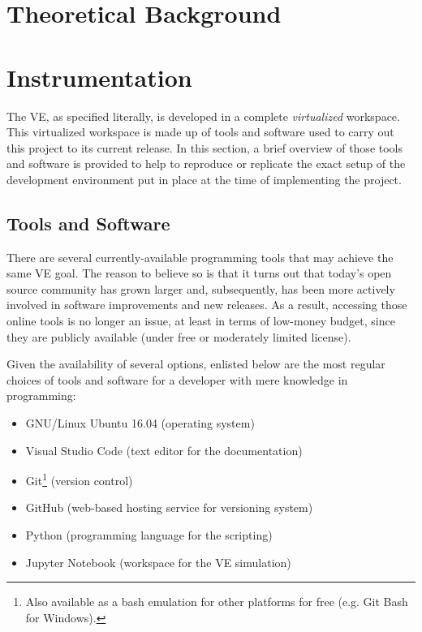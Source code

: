 %
%
%
%


\section{Theoretical Background}

\section{Instrumentation}

The VE, as specified literally, is developed in a complete \emph{virtualized} workspace. This virtualized workspace is made up of tools and software used to carry out this project to its current release. In this section, a brief overview of those tools and software is provided to help to reproduce or replicate the exact setup of the development environment put in place at the time of implementing the project.

\subsection{Tools and Software}
There are several currently-available programming tools that may achieve the same VE goal. The reason to believe so is that it turns out that today's open source community has grown larger and, subsequently, has been more actively involved in software improvements and new releases. As a result, accessing those online tools is no longer an issue, at least in terms of low-money budget, since they are publicly available (under free or moderately limited license).

Given the availability of several options, enlisted below are the most regular choices of  tools and software for a developer with mere knowledge in programming:
\begin{itemize}
    \item GNU/Linux Ubuntu 16.04 (operating system)
    \item Visual Studio Code (text editor for the documentation)
    \item Git\footnote{Also available as a bash emulation for other platforms for free (e.g. Git Bash for Windows).} (version control)
    \item GitHub (web-based hosting service for versioning system)
    \item Python (programming language for the scripting)
    \item Jupyter Notebook (workspace for the VE simulation)
\end{itemize}

